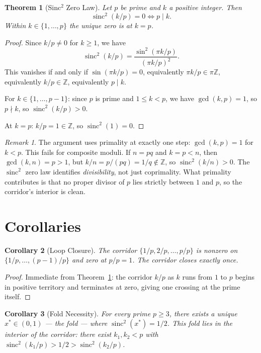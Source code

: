 \documentclass[11pt,reqno]{amsart}
\theoremstyle{plain}
\newtheorem{theorem}{Theorem}
\newtheorem{corollary}[theorem]{Corollary}
\theoremstyle{remark}
\newtheorem*{remark}{Remark}
\DeclareMathOperator{\sinc}{sinc}
\newcommand{\Z}{\mathbb{Z}}
\begin{document}
\begin{theorem}[Sinc$^2$ Zero Law]\label{thm:main}
Let $p$ be prime and $k$ a positive integer. Then
\begin{equation}\label{eq:main}
  \sinc^2(k/p)=0 \iff p\mid k.
\end{equation}
Within $k\in\{1,\dots,p\}$ the unique zero is at $k=p$.
\end{theorem}

\begin{proof}
Since $k/p\neq 0$ for $k\ge 1$, we have
\[
  \sinc^2(k/p)=\frac{\sin^2(\pi k/p)}{(\pi k/p)^2}.
\]
This vanishes if and only if $\sin(\pi k/p)=0$, equivalently
$\pi k/p\in\pi\Z$, equivalently $k/p\in\Z$, equivalently
$p\mid k$.

For $k\in\{1,\dots,p-1\}$: since $p$ is prime and $1\le k<p$, we
have $\gcd(k,p)=1$, so $p\nmid k$, so $\sinc^2(k/p)>0$.

At $k=p$: $k/p=1\in\Z$, so $\sinc^2(1)=0$.
\end{proof}

\begin{remark}
The argument uses primality at exactly one step: $\gcd(k,p)=1$ for
$k<p$. This fails for composite moduli. If $n=pq$ and $k=p<n$, then
$\gcd(k,n)=p>1$, but $k/n=p/(pq)=1/q\notin\Z$, so
$\sinc^2(k/n)>0$. The $\sinc^2$ zero law identifies
\emph{divisibility}, not just coprimality. What primality
contributes is that no proper divisor of $p$ lies strictly between
$1$ and $p$, so the corridor's interior is clean.
\end{remark}

\section{Corollaries}\label{sec:cor}

\begin{corollary}[Loop Closure]\label{cor:loop}
The corridor $\{1/p,2/p,\dots,p/p\}$ is nonzero on
$\{1/p,\dots,(p-1)/p\}$ and zero at $p/p=1$. The corridor closes
exactly once.
\end{corollary}

\begin{proof}
Immediate from Theorem~\ref{thm:main}: the corridor $k/p$ as $k$
runs from $1$ to $p$ begins in positive territory and terminates at
zero, giving one crossing at the prime itself.
\end{proof}

\begin{corollary}[Fold Necessity]\label{cor:fold}
For every prime $p\ge 3$, there exists a unique $x^{*}\in(0,1)$ ---
the \emph{fold} --- where $\sinc^2(x^{*})=1/2$. This fold lies in the
interior of the corridor: there exist $k_1,k_2<p$ with
$\sinc^2(k_1/p)>1/2>\sinc^2(k_2/p)$.
\end{corollary}
\end{document}
